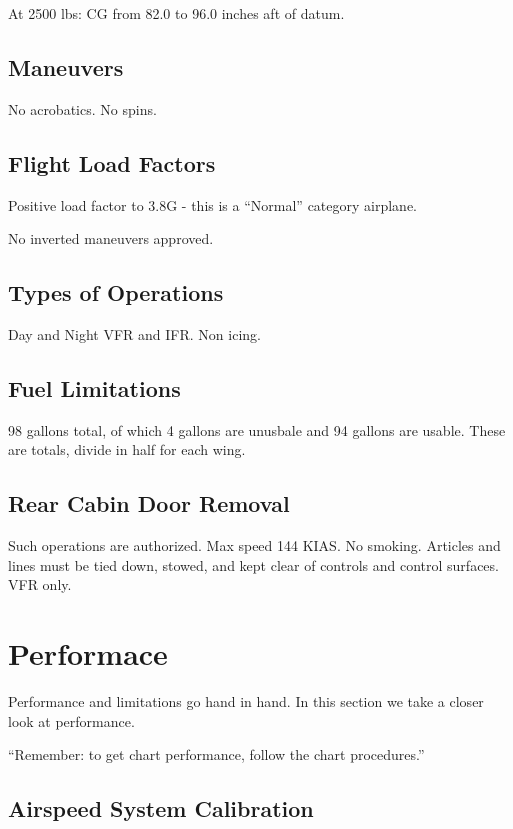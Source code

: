 At 2500 lbs: CG from 82.0 to 96.0 inches aft of datum.

\subsection{Maneuvers}

No acrobatics. No spins.

\subsection{Flight Load Factors}

Positive load factor to 3.8G - this is a ``Normal'' category airplane.

No inverted maneuvers approved.

\subsection{Types of Operations}

Day and Night VFR and IFR. Non icing.

\subsection{Fuel Limitations}

98 gallons total, of which 4 gallons are unusbale and 94 gallons are usable. These are totals, divide in half for each wing.

\subsection{Rear Cabin Door Removal}

Such operations are authorized. Max speed 144 KIAS. No smoking. Articles and lines must be tied down, stowed, and kept clear of controls and control surfaces. VFR only.


\section{Performace}

Performance and limitations go hand in hand. In this section we take a closer look at performance.

``Remember: to get chart performance, follow the chart procedures.''

\subsection{Airspeed System Calibration}

